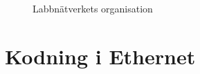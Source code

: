 \documentclass[swedish,10pt,a4paper]{report}
\begin{document}
\begin{figure}
  \centering
  \caption{Labbnätverkets organisation}\label{network_organization}
\end{figure}


\section{Kodning i Ethernet}\label{sec:kodningiethernet}
\end{document}
